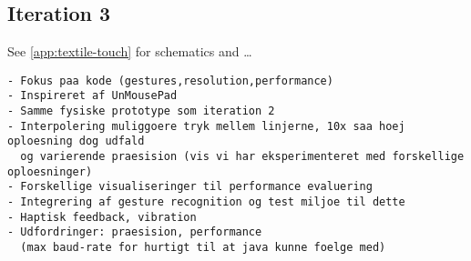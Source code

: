 \subsection{Iteration 3}
See \ref{app:textile-touch} for schematics and \dots
\begin{verbatim}
- Fokus paa kode (gestures,resolution,performance)
- Inspireret af UnMousePad
- Samme fysiske prototype som iteration 2
- Interpolering muliggoere tryk mellem linjerne, 10x saa hoej oploesning dog udfald 
  og varierende praesision (vis vi har eksperimenteret med forskellige oploesninger)
- Forskellige visualiseringer til performance evaluering
- Integrering af gesture recognition og test miljoe til dette
- Haptisk feedback, vibration
- Udfordringer: praesision, performance 
  (max baud-rate for hurtigt til at java kunne foelge med)
\end{verbatim}